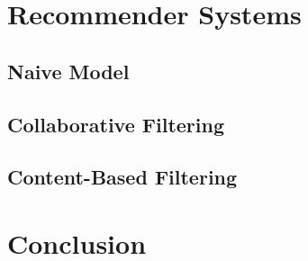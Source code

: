 \documentclass{article}
\begin{document}

\section{Recommender Systems}
\subsection{Naive Model}

\subsection{Collaborative Filtering}

\subsection{Content-Based Filtering}


\section{Conclusion}

\end{document}
